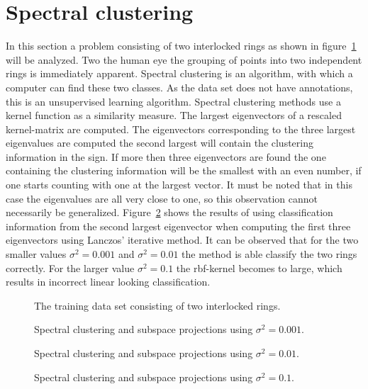 \section{Spectral clustering}
In this section a problem consisting of two interlocked rings as shown in figure~\ref{fig:interlock} will be analyzed. Two the human eye the grouping of points into two independent rings is immediately apparent. Spectral clustering is an algorithm, with which a computer can find these two classes. As the data set does not have annotations, this is an unsupervised learning algorithm. Spectral clustering methods use a kernel function as a similarity measure. The largest eigenvectors of a rescaled kernel-matrix are computed. The eigenvectors corresponding to the three largest eigenvalues are computed the second largest will contain the clustering information in the sign. If more then three eigenvectors are found the one containing the clustering information will be the smallest with an even number, if one starts counting with one at the largest vector. It must be noted that in this case the eigenvalues are all very close to one, so this observation cannot necessarily be generalized.  Figure~\ref{fig:clusteringResults} shows the results of using classification information from the second largest eigenvector when computing the first three eigenvectors using Lanczos' iterative method. It can be observed that for the two smaller values $\sigma^2 = 0.001$ and $\sigma^2 = 0.01$ the method is able classify the two rings correctly. For the larger value $\sigma^2 = 0.1$ the rbf-kernel becomes to large, which results in incorrect linear looking classification.  

\begin{figure}
\centering

\caption{The training data set consisting of two interlocked rings.}
\label{fig:interlock}
\end{figure}



\begin{figure}
\centering


\caption{Spectral clustering and subspace projections using $\sigma^2 = 0.001$.}


\caption{Spectral clustering and subspace projections using $\sigma^2 = 0.01$.}


\caption{Spectral clustering and subspace projections using $\sigma^2 = 0.1$.}
\label{fig:clusteringResults}
\end{figure}


